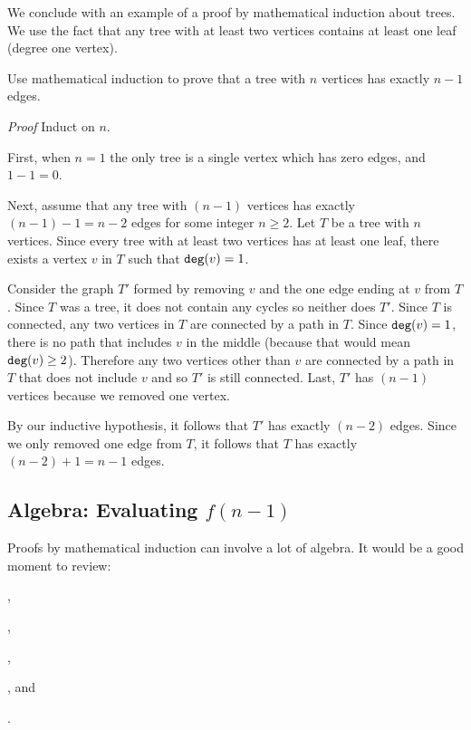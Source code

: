We conclude with an example of a proof by mathematical induction about trees.  We use the fact that any tree with at least two vertices contains at least one leaf (degree one vertex).

\begin{exam}
\label{exam_math_ind_tree_size}
    Use mathematical induction to prove that a tree with $n$ vertices has exactly $n-1$ edges.
        \begin{soln}
            \emph{Proof} Induct on $n$.  
            
            First, when $n=1$ the only tree is a single vertex which has zero edges, and $1-1=0$.  
            
            Next, assume that any tree with $(n-1)$ vertices has exactly $(n-1)-1 = n-2$ edges for some integer $n \ge 2$.  Let $T$ be a tree with $n$ vertices. Since every tree with at least two vertices has at least one leaf, there exists a vertex $v$ in $T$ such that $\texttt{deg}(v)=1$.  
            
            Consider the graph $T'$ formed by removing $v$ and the one edge ending at $v$ from $T$.  Since $T$ was a tree, it does not contain any cycles so neither does $T'$.  Since $T$ is connected, any two vertices in $T$ are connected by a path in $T$.  Since $\texttt{deg}(v)=1$, there is no path that includes $v$ in the middle (because that would mean $\texttt{deg}(v)\ge2$).  Therefore any two vertices other than $v$ are connected by a path in $T$ that does not include $v$ and so $T'$ is still connected.  Last, $T'$ has $(n-1)$ vertices because we removed one vertex.  
            
            By our inductive hypothesis, it follows that $T'$ has exactly $(n-2)$ edges.  Since we only removed one edge from $T$, it follows that $T$ has exactly $(n-2)+1=n-1$ edges. 
        \end{soln}
\end{exam}


\newcommand{\subalgind}{Algebra: Evaluating $f(n-1)$}
\subsection{\subalgind}
\label{sub_alg_ind}

Proofs by mathematical induction can involve a lot of algebra.  It would be a good moment to review:
    \begin{bull}
        \item {} {\subintalgebra},
        \item {} {\subfactorials},
        \item {} {\subexplog},
        \item {} {\subfractions}, and         
        \item {} {\subpolys}.
    \end{bull}

